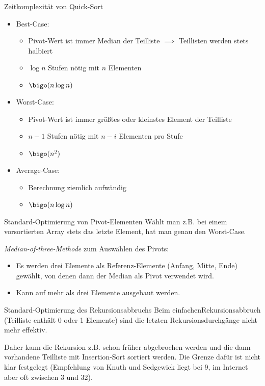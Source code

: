 \begin{defi}{Zeitkomplexität von Quick-Sort}
    \begin{itemize}
        \item Best-Case:
              \begin{itemize}
                  \item Pivot-Wert ist immer Median der Teilliste $\implies$ Teillisten werden stets halbiert
                  \item $\log n$ Stufen nötig mit $n$ Elementen
                  \item $\bigo(n \log n)$
              \end{itemize}
        \item Worst-Case:
              \begin{itemize}
                  \item Pivot-Wert ist immer größtes oder kleinstes Element der Teilliste
                  \item $n-1$ Stufen nötig mit $n-i$ Elementen pro Stufe
                  \item $\bigo(n^2)$
              \end{itemize}
        \item Average-Case:
              \begin{itemize}
                  \item Berechnung ziemlich aufwändig
                  \item $\bigo(n \log n)$
              \end{itemize}
    \end{itemize}
\end{defi}

\begin{bonus}{Standard-Optimierung von Pivot-Elementen}
    Wählt man z.B. bei einem vorsortierten Array stets das letzte Element, hat man genau den Worst-Case.

    \emph{Median-of-three-Methode} zum Auswählen des Pivots:
    \begin{itemize}
        \item Es werden drei Elemente als Referenz-Elemente (Anfang, Mitte, Ende) gewählt, von denen dann der Median als Pivot verwendet wird.
        \item Kann auf mehr als drei Elemente ausgebaut werden.
    \end{itemize}
\end{bonus}

\begin{bonus}{Standard-Optimierung des Rekursionsabbruchs}
    Beim \glqq einfachen\grqq  Rekursionsabbruch (Teilliste enthält 0 oder 1 Elemente) sind die letzten Rekursionsdurchgänge nicht mehr effektiv.

    Daher kann die Rekursion z.B. schon früher abgebrochen werden und die dann vorhandene Teilliste mit Insertion-Sort sortiert werden.
    Die Grenze dafür ist nicht klar festgelegt (Empfehlung von Knuth und Sedgewick liegt bei 9, im Internet aber oft zwischen 3 und 32).
\end{bonus}

